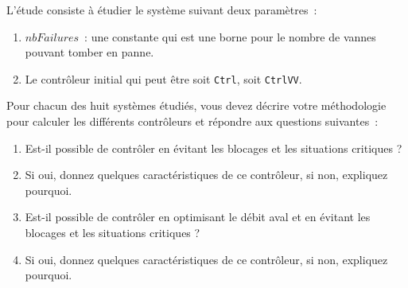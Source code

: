 L'étude consiste à étudier le système suivant deux paramètres~:
\begin{enumerate}
\item $nbFailures$~: une constante qui est une borne pour le nombre de vannes pouvant tomber en panne.
\item Le contrôleur initial qui peut être soit {\tt Ctrl}, soit {\tt CtrlVV}.
\end{enumerate}

Pour chacun des huit systèmes étudiés, vous devez décrire votre méthodologie pour calculer les différents contrôleurs et répondre aux questions suivantes~:

\begin{enumerate}
\item Est-il possible de contrôler en évitant les blocages et les situations critiques ?
\item Si oui, donnez quelques caractéristiques de ce contrôleur, si non, expliquez pourquoi.
\item Est-il possible de contrôler en optimisant le débit aval et en évitant les blocages et les situations critiques ?
\item Si oui, donnez quelques caractéristiques de ce contrôleur, si non, expliquez pourquoi.
\end{enumerate}
